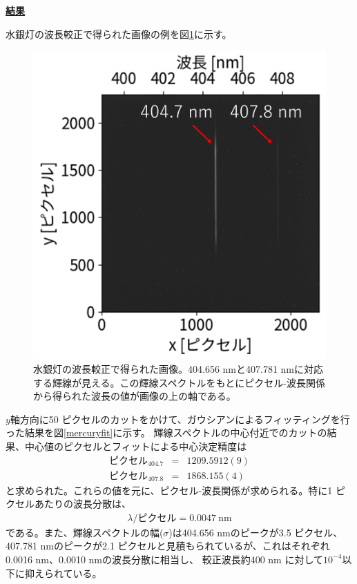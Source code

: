 \documentclass[a4paper,11pt,uplatex]{jsbook}
\begin{document}
\noindent \textbf{\underline{結果}}\par
水銀灯の波長較正で得られた画像の例を図\ref{mercury}に示す。
\begin{figure}[h]
  \centering
  \includegraphics[width=0.8\linewidth]{image/4-mercury.png}
  \caption[水銀灯の波長較正-1]{水銀灯の波長較正で得られた画像。404.656 nmと407.781 nmに対応する輝線が見える。この輝線スペクトルをもとにピクセル-波長関係から得られた波長の値が画像の上の軸である。}\label{mercury}
\end{figure}
$y$軸方向に50 ピクセルのカットをかけて、ガウシアンによるフィッティングを行った結果を図\ref{mercuryfit}に示す。
輝線スペクトルの中心付近でのカットの結果、中心値のピクセルとフィットによる中心決定精度は
\begin{eqnarray}
  ピクセル_{404.7} &=& 1209.5912(9)\\
  ピクセル_{407.8} &=& 1868.155(4) 
\end{eqnarray}
と求められた。これらの値を元に、ピクセル-波長関係が求められる。特に1 ピクセルあたりの波長分散は、
\begin{eqnarray}
  \lambda / ピクセル = 0.0047~\text{nm}
\end{eqnarray}
である。また、輝線スペクトルの幅($\sigma$)は404.656 nmのピークが3.5 ピクセル、407.781 nmのピークが2.1 ピクセルと見積もられているが、これはそれぞれ0.0016 nm、0.0010 nmの波長分散に相当し、
較正波長約400 nm に対して$10^{-4}$以下に抑えられている。
\end{document}
